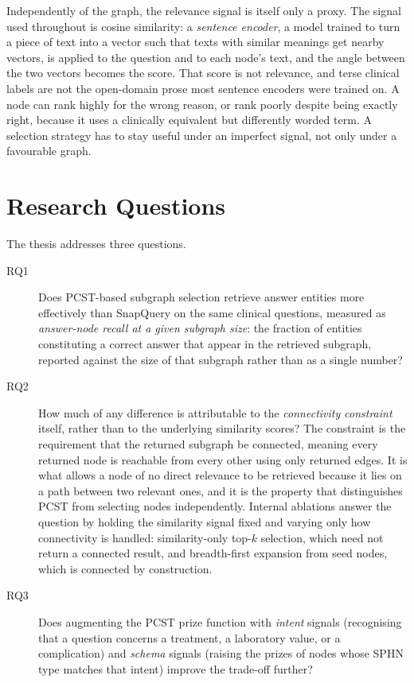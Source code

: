 Independently of the graph, the relevance signal is itself only a proxy. The
signal used throughout is cosine similarity: a \emph{sentence encoder}, a model
trained to turn a piece of text into a vector such that texts with similar
meanings get nearby vectors, is applied to the question and to each node's text,
and the angle between the two vectors becomes the score. That score is not
relevance, and terse clinical labels are not the open-domain prose most sentence
encoders were trained on. A node can rank highly for the wrong reason, or rank
poorly despite being exactly right, because it uses a clinically equivalent but
differently worded term. A selection strategy has to stay useful under an
imperfect signal, not only under a favourable graph.

\section{Research Questions} \label{sec:research-objectives}

The thesis addresses three questions.

\begin{description}
\item[RQ1] Does PCST-based subgraph selection retrieve answer entities more
effectively than SnapQuery on the same clinical questions, measured as
\emph{answer-node recall at a given subgraph size}: the fraction of entities
constituting a correct answer that appear in the retrieved subgraph, reported
against the size of that subgraph rather than as a single number?

\item[RQ2] How much of any difference is attributable to the
\emph{connectivity constraint} itself, rather than to the underlying similarity
scores? The constraint is the requirement that the returned subgraph be
connected, meaning every returned node is reachable from every other using only
returned edges. It is what allows a node of no direct relevance to be retrieved
because it lies on a path between two relevant ones, and it is the property that
distinguishes PCST from selecting nodes independently. Internal ablations answer
the question by holding the similarity signal fixed and varying only how
connectivity is handled: similarity-only top-$k$ selection, which need not
return a connected result, and breadth-first expansion from seed nodes, which is
connected by construction.

\item[RQ3] Does augmenting the PCST prize function with \emph{intent} signals
(recognising that a question concerns a treatment, a laboratory value, or a
complication) and \emph{schema} signals (raising the prizes of nodes whose SPHN
type matches that intent) improve the trade-off further?
\end{description}

